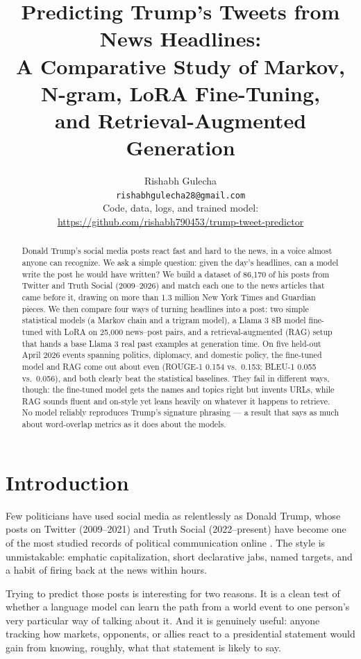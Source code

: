 \documentclass[11pt,a4paper]{article}
\title{\textbf{Predicting Trump's Tweets from News Headlines:\\
A Comparative Study of Markov, N-gram, LoRA Fine-Tuning,\\
and Retrieval-Augmented Generation}}
\author{
  Rishabh Gulecha\\
  \texttt{rishabhgulecha28@gmail.com}\\[4pt]
  \small Code, data, logs, and trained model:\\
  \small \url{https://github.com/rishabh790453/trump-tweet-predictor}
}
\date{}
\begin{document}
\maketitle

\begin{abstract}
Donald Trump's social media posts react fast and hard to the news, in a voice almost anyone can recognize. We ask a simple question: given the day's headlines, can a model write the post he would have written? We build a dataset of 86,170 of his posts from Twitter and Truth Social (2009--2026) and match each one to the news articles that came before it, drawing on more than 1.3 million New York Times and Guardian pieces. We then compare four ways of turning headlines into a post: two simple statistical models (a Markov chain and a trigram model), a Llama 3 8B model fine-tuned with LoRA on 25,000 news--post pairs, and a retrieval-augmented (RAG) setup that hands a base Llama 3 real past examples at generation time. On five held-out April 2026 events spanning politics, diplomacy, and domestic policy, the fine-tuned model and RAG come out about even (ROUGE-1 0.154 vs.\ 0.153; BLEU-1 0.055 vs.\ 0.056), and both clearly beat the statistical baselines. They fail in different ways, though: the fine-tuned model gets the names and topics right but invents URLs, while RAG sounds fluent and on-style yet leans heavily on whatever it happens to retrieve. No model reliably reproduces Trump's signature phrasing --- a result that says as much about word-overlap metrics as it does about the models.
\end{abstract}

\section{Introduction}

Few politicians have used social media as relentlessly as Donald Trump, whose posts on Twitter (2009--2021) and Truth Social (2022--present) have become one of the most studied records of political communication online \citep{wells2016trump}. The style is unmistakable: emphatic capitalization, short declarative jabs, named targets, and a habit of firing back at the news within hours.

Trying to predict those posts is interesting for two reasons. It is a clean test of whether a language model can learn the path from a world event to one person's very particular way of talking about it. And it is genuinely useful: anyone tracking how markets, opponents, or allies react to a presidential statement would gain from knowing, roughly, what that statement is likely to say.
\end{document}
